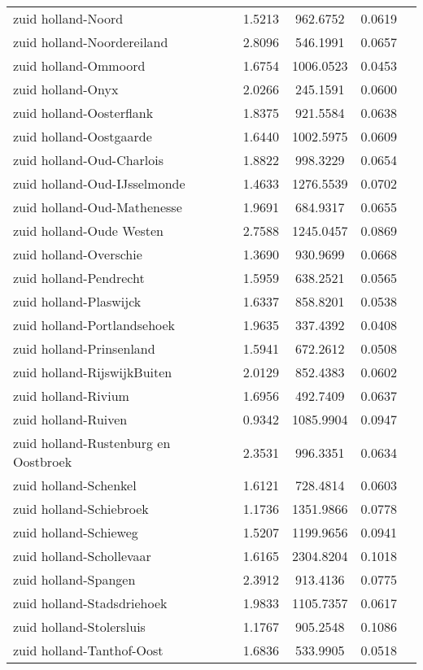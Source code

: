 \begin{longtable}{llccc}
zuid holland-Noord & 1.5213 & 962.6752 & 0.0619 \\
zuid holland-Noordereiland & 2.8096 & 546.1991 & 0.0657 \\
zuid holland-Ommoord & 1.6754 & 1006.0523 & 0.0453 \\
zuid holland-Onyx & 2.0266 & 245.1591 & 0.0600 \\
zuid holland-Oosterflank & 1.8375 & 921.5584 & 0.0638 \\
zuid holland-Oostgaarde & 1.6440 & 1002.5975 & 0.0609 \\
zuid holland-Oud-Charlois & 1.8822 & 998.3229 & 0.0654 \\
zuid holland-Oud-IJsselmonde & 1.4633 & 1276.5539 & 0.0702 \\
zuid holland-Oud-Mathenesse & 1.9691 & 684.9317 & 0.0655 \\
zuid holland-Oude Westen & 2.7588 & 1245.0457 & 0.0869 \\
zuid holland-Overschie & 1.3690 & 930.9699 & 0.0668 \\
zuid holland-Pendrecht & 1.5959 & 638.2521 & 0.0565 \\
zuid holland-Plaswijck & 1.6337 & 858.8201 & 0.0538 \\
zuid holland-Portlandsehoek & 1.9635 & 337.4392 & 0.0408 \\
zuid holland-Prinsenland & 1.5941 & 672.2612 & 0.0508 \\
zuid holland-RijswijkBuiten & 2.0129 & 852.4383 & 0.0602 \\
zuid holland-Rivium & 1.6956 & 492.7409 & 0.0637 \\
zuid holland-Ruiven & 0.9342 & 1085.9904 & 0.0947 \\
zuid holland-Rustenburg en Oostbroek & 2.3531 & 996.3351 & 0.0634 \\
zuid holland-Schenkel & 1.6121 & 728.4814 & 0.0603 \\
zuid holland-Schiebroek & 1.1736 & 1351.9866 & 0.0778 \\
zuid holland-Schieweg & 1.5207 & 1199.9656 & 0.0941 \\
zuid holland-Schollevaar & 1.6165 & 2304.8204 & 0.1018 \\
zuid holland-Spangen & 2.3912 & 913.4136 & 0.0775 \\
zuid holland-Stadsdriehoek & 1.9833 & 1105.7357 & 0.0617 \\
zuid holland-Stolersluis & 1.1767 & 905.2548 & 0.1086 \\
zuid holland-Tanthof-Oost & 1.6836 & 533.9905 & 0.0518 \\

\end{longtable}
